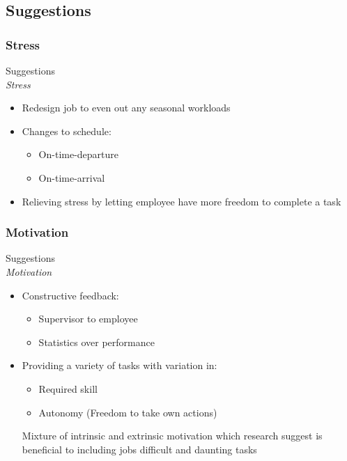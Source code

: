 \subsection{Suggestions}
\subsubsection{Stress}
\begin{frame}{Suggestions\\\small\textit{Stress}}{}
    \begin{itemize}
        \item Redesign job to even out any seasonal workloads
        \item Changes to schedule:
            \begin{itemize}
                \item On-time-departure
                \item On-time-arrival
            \end{itemize}
        \item Relieving stress by letting employee have more freedom to complete a task
    \end{itemize}
\end{frame}

\subsubsection{Motivation}
\begin{frame}{Suggestions\\\small\textit{Motivation}}{}
    \begin{itemize}
        \item Constructive feedback:
            \begin{itemize}
                \item Supervisor to employee
                \item Statistics over performance
            \end{itemize}
        \item Providing a variety of tasks with variation in:
            \begin{itemize}
                \item Required skill
                \item Autonomy (Freedom to take own actions)
            \end{itemize}
            Mixture of intrinsic and extrinsic motivation which research suggest is beneficial to including jobs difficult and daunting tasks
    \end{itemize}
\end{frame}